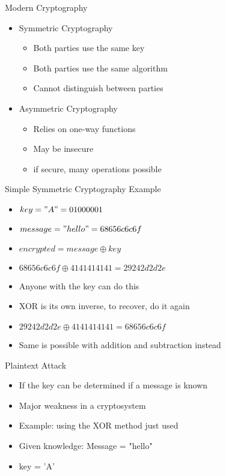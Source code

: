 \begin{withoutheadline}
\begin{frame}{Modern Cryptography}
\begin{itemize}
    \item Symmetric Cryptography
    \begin{itemize}
    \item Both parties use the same key
    \item Both parties use the same algorithm
    \item Cannot distinguish between parties
    \end{itemize}
    \item Asymmetric Cryptography
    \begin{itemize}
    \item Relies on one-way functions
    \item May be insecure
    \item if secure, many operations possible
    \end{itemize}
\end{itemize}
\end{frame}

\begin{frame}{Simple Symmetric Cryptography Example}
\begin{itemize}
    \item $key = "A" = 01000001$
    \item $message = "hello" = 68 65 6c 6c 6f$ 
    \item $encrypted = message \oplus key$
    \item $68 65 6c 6c 6f \oplus 41 41 41 41 41 = 29 24 2d 2d 2e$
    \item Anyone with the key can do this
    \item XOR is its own inverse, to recover, do it again
    \item $29 24 2d 2d 2e \oplus 41 41 41 41 41 = 68 65 6c 6c 6f$
    \item Same is possible with addition and subtraction instead 
\end{itemize}
\end{frame}

\begin{frame}{Plaintext Attack}
\begin{itemize}
    \item If the key can be determined if a message is known
    \item Major weakness in a cryptosystem
    \item Example: using the XOR method just used
    \item Given knowledge: Message = "hello"
    \item key = 'A'
\end{itemize}
\end{frame}


\end{withoutheadline}
